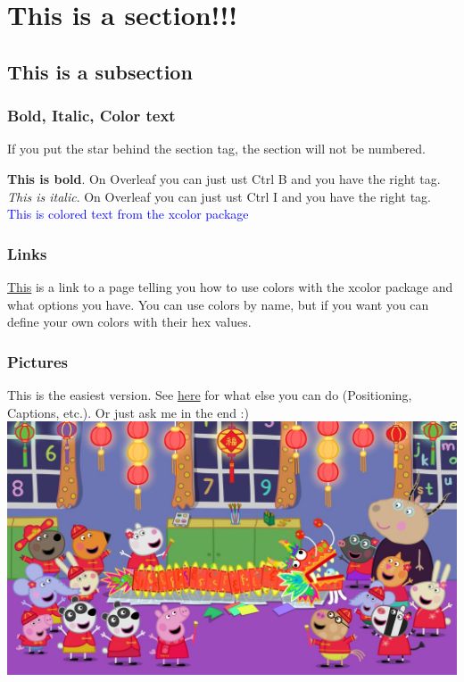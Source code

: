 \documentclass[../main.tex]{subfiles}
\begin{document}
\section{This is a section!!!}
\subsection{This is a subsection}

\subsubsection*{Bold, Italic, Color text}

If you put the star behind the section tag, the section will not be numbered.

\textbf{This is bold}. On Overleaf you can just ust Ctrl B and you have the right tag.
\textit{This is italic}. On Overleaf you can just ust Ctrl I and you have the right tag.
\textcolor{blue}{This is colored text from the xcolor package}

\subsubsection*{Links}
 
\href{https://ftp.agdsn.de/pub/mirrors/latex/dante/macros/latex/contrib/xcolor/xcolor.pdf}{This} is a link to a page telling you how to use colors with the xcolor package and what options you have. You can use colors by name, but if you want you can define your own colors with their hex values.
 
\subsubsection*{Pictures}

This is the easiest version. See \href{https://www.overleaf.com/learn/latex/Inserting_Images}{here} for what else you can do (Positioning, Captions, etc.). Or just ask me in the end :) \\

\includegraphics[width=\textwidth]{images/peppaPig.jpg}
\end{document}
